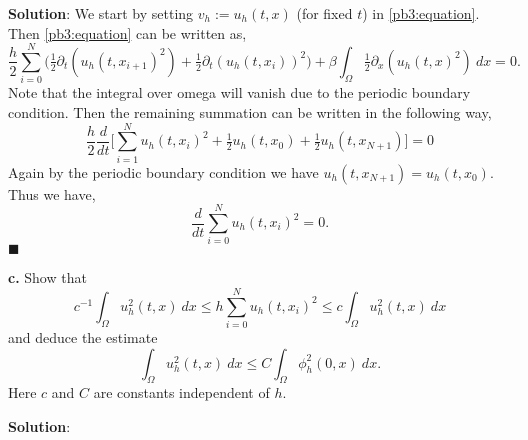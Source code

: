 \documentclass[11pt]{article}
\begin{document}
\textbf{Solution}: We start by setting $v_h := u_h(t,x)$ (for fixed $t$) in \eqref{pb3:equation}.
Then \eqref{pb3:equation} can be written as,
\begin{equation}
    \frac{h}{2} \sum_{i=0}^N \big(\tfrac{1}{2} \partial_t(u_h(t,x_{i+1})^2) + \tfrac{1}{2} \partial_t (u_h(t,x_i))^2 \big) + \beta \int_\Omega \tfrac{1}{2} \partial_x(u_h(t,x)^2) \: dx = 0.
\end{equation}
Note that the integral over omega will vanish due to the periodic boundary condition.
Then the remaining summation can be written in the following way,
\begin{equation}
    \frac{h}{2}  \frac{d}{dt} \Big[ \sum_{i=1}^{N} u_h(t,x_i)^2 + \tfrac{1}{2} u_h(t,x_0) + \tfrac{1}{2} u_h(t,x_{N+1})  \Big] = 0
\end{equation}
Again by the periodic boundary condition we have $u_h(t,x_{N+1}) = u_h(t,x_0)$. 
Thus we have, 
\begin{equation}
    \frac{d}{dt} \sum_{i=0}^N u_h(t,x_i)^2 = 0.
\end{equation}
$\blacksquare$

\vskip 2cm


\textbf{c.} Show that 
\begin{equation}
    c^{-1} \int_\Omega u^2_h(t,x) \: dx \leq h \sum_{i=0}^N u_h(t,x_i)^2 \leq c \int_\Omega u^2_h(t,x) \: dx
\end{equation}
and deduce the estimate 
\begin{equation}
    \int_\Omega u^2_h(t,x) \: dx \leq C\int_\Omega \phi^2_h(0,x) \: dx.
\end{equation}
Here $c$ and $C$ are constants independent of $h$.

\vskip 1cm

\textbf{Solution}: 

\vskip 2cm
\end{document}
